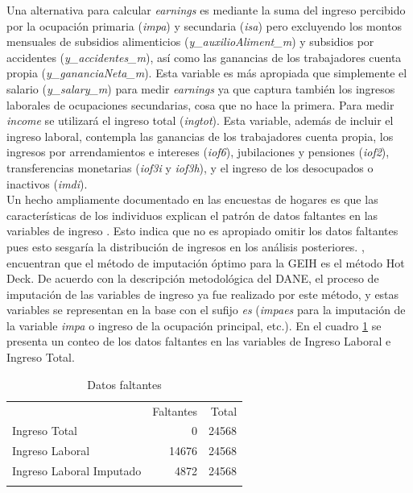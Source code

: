 \documentclass[11pt,a4paper]{article}
\begin{document}
Una alternativa para calcular \emph{earnings} es mediante la suma del ingreso percibido por la ocupación primaria (\textit{impa}) y secundaria (\textit{isa}) pero excluyendo los montos mensuales de subsidios alimenticios (\textit{y\_auxilioAliment\_m}) y subsidios por accidentes (\textit{y\_accidentes\_m}), así como las ganancias de los trabajadores cuenta propia (\textit{y\_gananciaNeta\_m}). Esta variable es más apropiada que simplemente el salario (\textit{y\_salary\_m}) para medir \emph{earnings} ya que captura también los ingresos laborales de ocupaciones secundarias, cosa que no hace la primera. Para medir \emph{income} se utilizará el ingreso total (\textit{ingtot}). Esta variable, además de incluir el ingreso laboral, contempla las ganancias de los trabajadores cuenta propia, los ingresos por arrendamientos e intereses (\textit{iof6}), jubilaciones y pensiones (\textit{iof2}), 
transferencias monetarias (\textit{iof3i} y \textit{iof3h}), y el ingreso de los desocupados o inactivos (\textit{imdi}). \\

Un hecho ampliamente documentado en las encuestas de hogares es que las características de los individuos explican el patrón de datos faltantes en las variables de ingreso \citep{imputacionGEIH}. Esto indica que no es apropiado omitir los datos faltantes pues esto sesgaría la distribución
de ingresos en los análisis posteriores. \cite{imputacionGEIH}, encuentran que el método de imputación óptimo para la GEIH es el método Hot Deck. De acuerdo con la descripción metodológica del DANE, el proceso de imputación de las variables de ingreso ya fue realizado por este método, y estas variables
se representan en la base con el sufijo \emph{es} (\textit{impaes} para la imputación de la variable \textit{impa} o ingreso de la ocupación principal, etc.). En el cuadro \ref{tbl:DatosFaltantes} se presenta un conteo de los datos faltantes en las variables de Ingreso Laboral e Ingreso Total.


\begin{table}[H]
  \centering
  \caption{Datos faltantes} 
  \label{tab:missing}
  \begingroup\fontsize{9pt}{10pt}\selectfont
  \begin{tabular}{lrr}
    \hline
  \addlinespace
    & Faltantes & Total \\
  \addlinespace
   \hline
   Ingreso Total &   0 & 24568 \\ 
    Ingreso Laboral & 14676 & 24568 \\ 
    Ingreso Laboral Imputado & 4872 & 24568 \\ 
     \addlinespace
  \hline
  \addlinespace
  \end{tabular}
  \endgroup
  \label{tbl:DatosFaltantes}
  \end{table}
  
\end{document}
